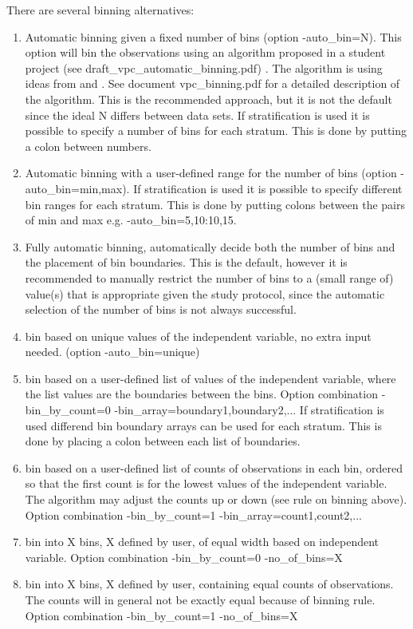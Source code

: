 There are several binning alternatives:
\begin{enumerate}
	\item Automatic binning given a fixed number of bins (option -auto\_bin=N). This option 
will bin the observations using an algorithm proposed in a student project (see draft\_vpc\_automatic\_binning.pdf) \cite{Sonehag}. The algorithm is using ideas from \cite{Calinski} and \cite{Lavielle}. 
See document vpc\_binning.pdf for a detailed description of the algorithm.
This is the recommended approach, but it is not the default since the ideal N differs between data sets. If stratification is used it is possible to specify a number of bins for each stratum. This is done by putting a colon between numbers.
	\item Automatic binning with a user-defined range for the number of bins (option -auto\_bin=min,max). If stratification is used it is possible to specify different bin ranges for each stratum. This is done by putting colons between the pairs of min and max e.g. -auto\_bin=5,10:10,15. 
	\item Fully automatic binning, automatically decide both the number of bins and the placement of bin boundaries.
This is the default, however it is recommended to manually restrict the number of bins to a (small range of) value(s)
that is appropriate given the study protocol, since the automatic selection of the number of bins \cite{Sonehag} 
is not always 
successful.
	\item bin based on unique values of the independent variable, no extra input needed. (option -auto\_bin=unique)
	\item bin based on a user-defined list of values of the independent variable, where the list values are the boundaries between the bins. Option combination -bin\_by\_count=0 -bin\_array=boundary1,boundary2,... If stratification is used differend bin boundary arrays can be used for each stratum. This is done by placing a colon between each list of boundaries.
	\item bin based on a user-defined list of counts of observations in each bin, ordered so that the first count is for the lowest values of the independent variable. The algorithm may adjust the counts up or down (see rule on binning above). Option combination  -bin\_by\_count=1 -bin\_array=count1,count2,...
	\item bin into X bins, X defined by user, of equal width based on independent variable. Option combination -bin\_by\_count=0 -no\_of\_bins=X
	\item bin into X bins, X defined by user, containing equal counts of observations. The counts will in general not be exactly equal because of binning rule. Option combination -bin\_by\_count=1 -no\_of\_bins=X

\end{enumerate}
